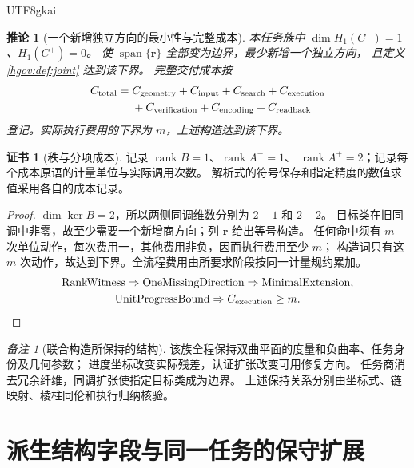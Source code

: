 \documentclass[12pt,a4paper,openany,notitlepage]{report}
\theoremstyle{plain}
\newtheorem{corollary}[theorem]{推论}
\theoremstyle{definition}
\newtheorem*{certificate}{证书}
\theoremstyle{remark}
\newtheorem{remark}[theorem]{备注}
\begin{document}
\begin{CJK*}{UTF8}{gkai}
\begin{corollary}[一个新增独立方向的最小性与完整成本]
\label{hgov:cor:jointcost}
本任务族中 $\dim H_1(C^-)=1$、$H_1(C^+)=0$。
使 $\operatorname{span}\{\mathbf r\}$ 全部变为边界，最少新增一个独立方向，
且定义 \ref{hgov:def:joint} 达到该下界。
完整交付成本按
\[
\begin{aligned}
C_{\rm total}={}&C_{\rm geometry}+C_{\rm input}+C_{\rm search}
+C_{\rm execution}\\
&+C_{\rm verification}+C_{\rm encoding}+C_{\rm readback}
\end{aligned}
\]
登记。实际执行费用的下界为 $m$，上述构造达到该下界。
\end{corollary}
\begin{certificate}[秩与分项成本]
记录 $\operatorname{rank}B=1$、$\operatorname{rank}A^-=1$、
$\operatorname{rank}A^+=2$；记录每个成本原语的计量单位与实际调用次数。
解析式的符号保存和指定精度的数值求值采用各自的成本记录。
\end{certificate}
\begin{proof}
$\dim\ker B=2$，所以两侧同调维数分别为 $2-1$ 和 $2-2$。
目标类在旧同调中非零，故至少需要一个新增商方向；列 $\mathbf r$ 给出等号构造。
任何命中须有 $m$ 次单位动作，每次费用一，其他费用非负，因而执行费用至少 $m$；
构造词只有这 $m$ 次动作，故达到下界。全流程费用由所要求阶段按同一计量规约累加。
\begin{gather*}
\operatorname{RankWitness}
\Rightarrow\operatorname{OneMissingDirection}
\Rightarrow\operatorname{MinimalExtension},\\
\operatorname{UnitProgressBound}\Rightarrow C_{\rm execution}\ge m .\qedhere
\end{gather*}
\end{proof}

\begin{remark}[联合构造所保持的结构]
该族全程保持双曲平面的度量和负曲率、任务身份及几何参数；
进度坐标改变实际残差，认证扩张改变可用修复方向。
任务商消去冗余纤维，同调扩张使指定目标类成为边界。
上述保持关系分别由坐标式、链映射、棱柱同伦和执行归纳核验。
\end{remark}

\section{派生结构字段与同一任务的保守扩展}


\end{CJK*}
\end{document}
